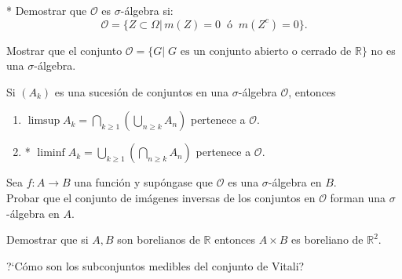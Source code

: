 \documentclass{book}
\newcommand{\rr}{\mathbb{R}}
\begin{document}
 \begin{ejer}{}  * 	Demostrar que $\mathscr{O}$ es $\sigma$-álgebra si:
	\[\mathscr{O}=\{Z\subset \Omega|\,m(Z)=0 \;\;\text{ó}\;\; m(Z^c)=0\}.
	\]
	\end{ejer} 


\begin{ejer}{} 
Mostrar que el conjunto $\mathscr{O}=\{G|\; G \text{ es un conjunto abierto o cerrado de } \mathbb{R}\}$ no es una $\sigma$-álgebra. 
\end{ejer} 


\begin{ejer}{} 
Si $(A_k)$ es una sucesi\'on de conjuntos en una $\sigma$-\'algebra $\mathscr{O}$, entonces
\begin{enumerate}
\item $\limsup A_k=\bigcap\limits_{k\geq 1}\left(\bigcup\limits_{n\geq k} A_n\right)$ pertenece a $\mathscr{O}$.
\item * $\liminf A_k=\bigcup\limits_{k\geq 1}\left(\bigcap\limits_{n\geq k} A_n\right)$ pertenece a $\mathscr{O}$.
 \end{enumerate}
 \end{ejer}  





\begin{ejer}{} 
Sea $f: A\to B$ una funci\'on  y sup\'ongase que $\mathscr{O}$ es una $\sigma$-\'algebra en $B$. \\
Probar que el conjunto de im\'agenes inversas de los conjuntos en $\mathscr{O}$  forman una 
$\sigma$-\'algebra en $A$. 
\end{ejer}


  

	\begin{ejer}{} Demostrar que si $A,B$ son borelianos de $\rr$ entonces $A\times B$ es boreliano de $\rr^2$. 
	 	\end{ejer}




  
  
   \begin{ejer}{} 
	?`Cómo son los subconjuntos medibles del conjunto de Vitali?
\end{ejer} 
\end{document}

